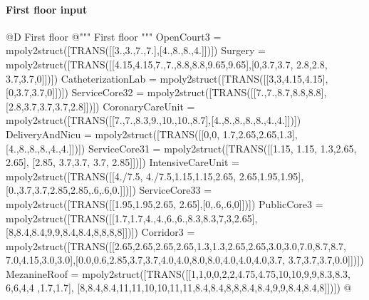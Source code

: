 \documentclass[11pt,oneside]{article}    %
\begin{document}
\paragraph{First floor input}
@D First floor
@{""" First floor """
OpenCourt3 = mpoly2struct([TRANS([[3.,3.,7.,7.],[4.,8.,8.,4.]])])
Surgery = mpoly2struct([TRANS([[4.15,4.15,7.,7.,8.8,8.8,9.65,9.65],[0,3.7,3.7, 2.8,2.8, 3.7,3.7,0]])])
CatheterizationLab = mpoly2struct([TRANS([[3,3,4.15,4.15],[0,3.7,3.7,0]])])
ServiceCore32 = mpoly2struct([TRANS([[7.,7.,8.7,8.8,8.8],[2.8,3.7,3.7,3.7,2.8]])])
CoronaryCareUnit = mpoly2struct([TRANS([[7.,7.,8.3,9.,10.,10.,8.7],[4.,8.,8.,8.,8.,4.,4.]])])
DeliveryAndNicu = mpoly2struct([TRANS([[0,0, 1.7,2.65,2.65,1.3],[4.,8.,8.,8.,4.,4.]])])
ServiceCore31 = mpoly2struct([TRANS([[1.15, 1.15, 1.3,2.65, 2.65], [2.85, 3.7,3.7, 3.7, 2.85]])])
IntensiveCareUnit = mpoly2struct([TRANS([[4./7.5, 4./7.5,1.15,1.15,2.65, 2.65,1.95,1.95], [0.,3.7,3.7,2.85,2.85,.6,.6,0.]])])
ServiceCore33 = mpoly2struct([TRANS([[1.95,1.95,2.65, 2.65],[0,.6,.6,0]])])
PublicCore3 = mpoly2struct([TRANS([[1.7,1.7,4.,4.,6.,6.,8.3,8.3,7,3,2.65], [8,8.4,8.4,9,9,8.4,8.4,8,8,8,8]])])
Corridor3 = mpoly2struct([TRANS([[2.65,2.65,2.65,2.65,1.3,1.3,2.65,2.65,3.0,3.0,7.0,8.7,8.7, 7.0,4.15,3.0,3.0],[0.0,0.6,2.85,3.7,3.7,4.0,4.0,8.0,8.0,4.0,4.0,4.0,3.7, 3.7,3.7,3.7,0.0]])])
MezanineRoof = mpoly2struct([TRANS([[1,1,0,0,2,2,4.75,4.75,10,10,9,9,8.3,8.3, 6,6,4,4 ,1.7,1.7], [8,8.4,8.4,11,11,10,10,11,11,8.4,8.4,8,8,8.4,8.4,9,9,8.4,8.4,8]])])
@}
\end{document}
